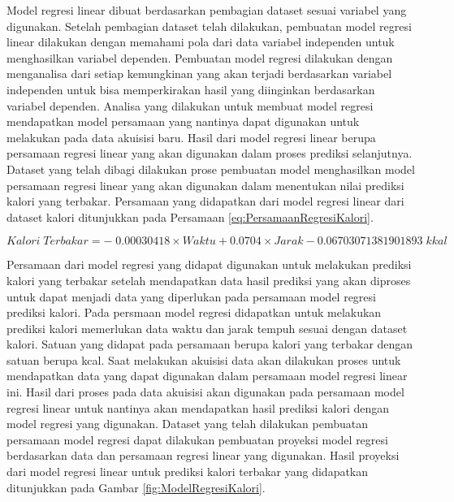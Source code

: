 Model regresi linear dibuat berdasarkan pembagian dataset sesuai variabel yang digunakan. Setelah pembagian dataset telah dilakukan, pembuatan model regresi linear dilakukan dengan memahami pola dari data variabel independen untuk menghasilkan variabel dependen. Pembuatan model regresi dilakukan dengan menganalisa dari setiap kemungkinan yang akan terjadi berdasarkan variabel independen untuk bisa memperkirakan hasil yang diinginkan berdasarkan variabel dependen. Analisa yang dilakukan untuk membuat model regresi mendapatkan model persamaan yang nantinya dapat digunakan untuk melakukan pada data akuisisi baru. Hasil dari model regresi linear berupa persamaan regresi linear yang akan digunakan dalam proses prediksi selanjutnya. Dataset yang telah dibagi dilakukan prose pembuatan model menghasilkan model persamaan regresi linear yang akan digunakan dalam menentukan nilai prediksi kalori yang terbakar. Persamaan yang didapatkan dari model regresi linear dari dataset kalori ditunjukkan pada Persamaan \ref{eq:PersamaanRegresiKalori}.

\begin{equation}
  \label{eq:PersamaanRegresiKalori}
  Kalori \; Terbakar = - \; 0.00030418 \times Waktu + 0.0704 \times Jarak - 0.06703071381901893 \; kkal
\end{equation}

Persamaan dari model regresi yang didapat digunakan untuk melakukan prediksi kalori yang terbakar setelah mendapatkan data hasil prediksi yang akan diproses untuk dapat menjadi data yang diperlukan pada persamaan model regresi prediksi kalori. Pada persmaan model regresi didapatkan untuk melakukan prediksi kalori memerlukan data waktu dan jarak tempuh sesuai dengan dataset kalori. Satuan yang didapat pada persamaan berupa kalori yang terbakar dengan satuan berupa kcal. Saat melakukan akuisisi data akan dilakukan proses untuk mendapatkan data yang dapat digunakan dalam persamaan model regresi linear ini. Hasil dari proses pada data akuisisi akan digunakan pada persamaan model regresi linear untuk nantinya akan mendapatkan hasil prediksi kalori dengan model regresi yang digunakan. Dataset yang telah dilakukan pembuatan persamaan model regresi dapat dilakukan pembuatan proyeksi model regresi berdasarkan data dan persamaan regresi linear yang digunakan. Hasil proyeksi dari model regresi linear untuk prediksi kalori terbakar yang didapatkan ditunjukkan pada Gambar \ref{fig:ModelRegresiKalori}.

